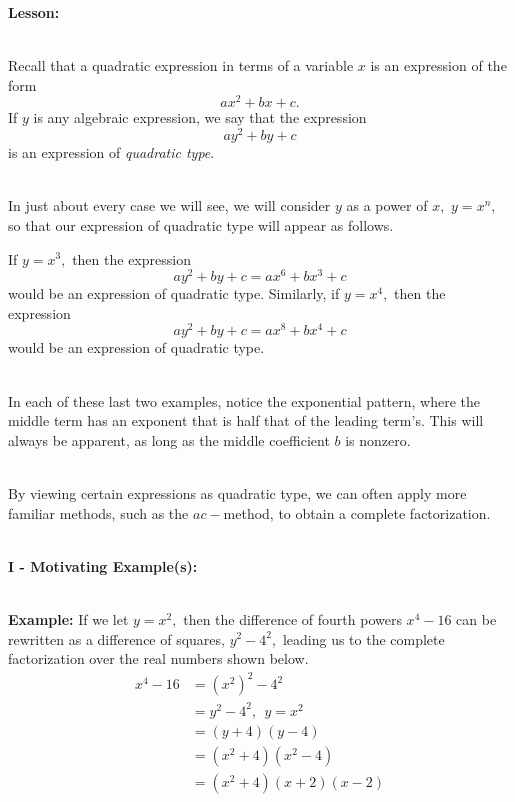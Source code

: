 \documentclass[12pt]{article}
\theoremstyle{definition}
\begin{document}
{\bf Lesson:}\\
\ \par
Recall that a quadratic expression in terms of a variable $x$ is an expression of the form $$ax^2+bx+c.$$
If $y$ is any algebraic expression, we say that the expression $$ay^2+by+c$$ is an expression of {\it quadratic type}.\\
\ \par
In just about every case we will see, we will consider $y$ as a power of $x,$ $y=x^n,$ so that our expression of quadratic type will appear as follows.
\begin{center}
\end{center}
If $y=x^3,$ then the expression $$ay^2+by+c=ax^6+bx^3+c$$
would be an expression of quadratic type.
\newpage
Similarly, if $y=x^4,$ then the expression $$ay^2+by+c=ax^8+bx^4+c$$
would be an expression of quadratic type.\\
\ \par
In each of these last two examples, notice the exponential pattern, where the middle term has an exponent that is half that of the leading term's.  This will always be apparent, as long as the middle coefficient $b$ is nonzero.\\
\ \par
By viewing certain expressions as quadratic type, we can often apply more familiar methods, such as the $ac-$method, to obtain a complete factorization.\\
\ \par
{\bf I - Motivating Example(s):}\\
\ \par
{\bf Example:} If we let $y=x^2,$ then the difference of fourth powers $x^4-16$ can be rewritten as a difference of squares,
$y^2-4^2,$ leading us to the complete factorization over the real numbers shown below.
\begin{equation*}
	\begin{split}
		x^4-16&=\left(x^2\right)^2-4^2\\
		&=y^2-4^2, \ \ y=x^2\\
		&=\left(y+4\right)\left(y-4\right)\\
		&=\left(x^2+4\right)\left(x^2-4\right)\\
		&=\left(x^2+4\right)\left(x+2\right)\left(x-2\right)
	\end{split}
\end{equation*}
\end{document}
